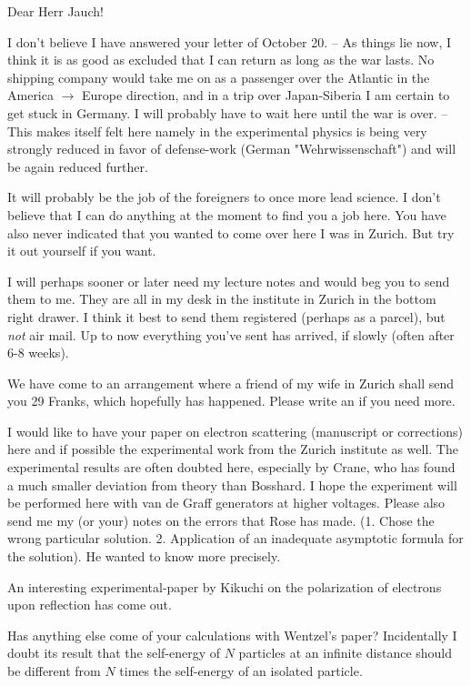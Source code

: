 \date{January 1, 1941}

Dear Herr Jauch!

I don't believe I have answered your letter of October 20. -- As things lie now, I think it is as good as excluded that I can return as long as the war lasts. No shipping company would take me on as a passenger over the Atlantic in the America $\to$ Europe direction, and in a trip over Japan-Siberia I am certain to get stuck in Germany. I will probably have to wait here until the war is over. -- This makes itself felt here namely in the experimental physics is being very strongly reduced in favor of defense-work (German "Wehrwissenschaft") and will be again reduced further.

It will probably be the job of the foreigners to once more lead science. I don't believe that I can do anything at the moment to find you a job here. You have also never indicated that you wanted to come over here  I was in Zurich. But try it out yourself if you want.

I will perhaps sooner or later need my lecture notes and would beg you to send them to me. They are all in my desk in the institute in Zurich in the bottom right drawer. I think it best to send them registered (perhaps as a parcel), but \textit{not} air mail. Up to now everything you've sent has arrived, if slowly (often after 6-8 weeks).

We have come to an arrangement where a friend of my wife in Zurich shall send you 29 Franks, which hopefully has happened. Please write an  if you need more.

I would like to have your paper on electron scattering (manuscript or corrections) here and if possible the experimental work from the Zurich institute as well. The experimental results are often doubted here, especially by Crane, who has found a much smaller deviation from theory than Bosshard. I hope the experiment will be performed here with van de Graff generators at higher voltages. Please also send me my (or your) notes on the errors that Rose has made. (1. Chose the wrong particular solution. 2. Application of an inadequate asymptotic formula for the solution). He wanted to know more precisely.

An interesting experimental-paper by Kikuchi on the polarization of electrons upon reflection has come out.

Has anything else come of your calculations with Wentzel's paper? Incidentally I doubt its result that the self-energy of $N$ particles at an infinite distance should be different from $N$ times the self-energy of an isolated particle.

